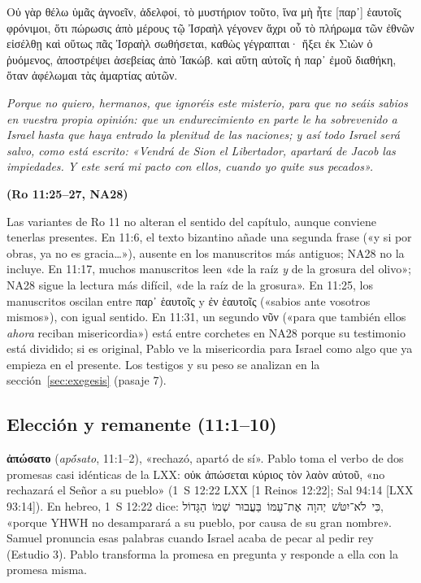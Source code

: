 \documentclass[11pt,letterpaper]{article}
\newcommand{\heb}[1]{\mbox{\foreignlanguage{hebrew}{#1}}}
\newcommand{\grc}[1]{\foreignlanguage{ancientgreek}{#1}}
\newcommand{\fuente}[1]{\par\hfill{\upshape\bfseries\small\textcolor{ladrillo}{#1}}}
\begin{document}
\begin{cita}[fontupper=\upshape]
\grc{Οὐ γὰρ θέλω ὑμᾶς ἀγνοεῖν, ἀδελφοί, τὸ μυστήριον τοῦτο, ἵνα μὴ ἦτε [παρ᾿] ἑαυτοῖς φρόνιμοι, ὅτι πώρωσις ἀπὸ μέρους τῷ Ἰσραὴλ γέγονεν ἄχρι οὗ τὸ πλήρωμα τῶν ἐθνῶν εἰσέλθῃ καὶ οὕτως πᾶς Ἰσραὴλ σωθήσεται, καθὼς γέγραπται· ἥξει ἐκ Σιὼν ὁ ῥυόμενος, ἀποστρέψει ἀσεβείας ἀπὸ Ἰακώβ. καὶ αὕτη αὐτοῖς ἡ παρ᾿ ἐμοῦ διαθήκη, ὅταν ἀφέλωμαι τὰς ἁμαρτίας αὐτῶν.}\par\smallskip
\itshape Porque no quiero, hermanos, que ignoréis este misterio, para que no seáis sabios en vuestra propia opinión: que un endurecimiento en parte le ha sobrevenido a Israel hasta que haya entrado la plenitud de las naciones; y así todo Israel será salvo, como está escrito: «Vendrá de Sion el Libertador, apartará de Jacob las impiedades. Y este será mi pacto con ellos, cuando yo quite sus pecados».\fuente{(Ro 11:25--27, NA28)}
\end{cita}

\begin{nota}
Las variantes de Ro 11 no alteran el sentido del capítulo, aunque conviene tenerlas presentes. En 11:6, el texto bizantino añade una segunda frase («y si por obras, ya no es gracia\ldots»), ausente en los manuscritos más antiguos; NA28 no la incluye. En 11:17, muchos manuscritos leen «de la raíz \emph{y} de la grosura del olivo»; NA28 sigue la lectura más difícil, «de la raíz de la grosura». En 11:25, los manuscritos oscilan entre \grc{παρ᾿ ἑαυτοῖς} y \grc{ἐν ἑαυτοῖς} («sabios ante vosotros mismos»), con igual sentido. En 11:31, un segundo \grc{νῦν} («para que también ellos \emph{ahora} reciban misericordia») está entre corchetes en NA28 porque su testimonio está dividido; si es original, Pablo ve la misericordia para Israel como algo que ya empieza en el presente. Los testigos y su peso se analizan en la sección~\ref{sec:exegesis} (pasaje 7).
\end{nota}

\subsection{Elección y remanente (11:1--10)}

\textbf{\grc{ἀπώσατο}} (\emph{apṓsato}, 11:1--2), «rechazó, apartó de sí». Pablo toma el verbo de dos promesas casi idénticas de la LXX: \grc{οὐκ ἀπώσεται κύριος τὸν λαὸν αὐτοῦ}, «no rechazará el Señor a su pueblo» (1~S 12:22 LXX [1 Reinos 12:22]; Sal 94:14 [LXX 93:14]). En hebreo, 1~S 12:22 dice: \heb{כִּי לֹא־יִטֹּשׁ יְהוָה אֶת־עַמּוֹ בַּעֲבוּר שְׁמוֹ הַגָּדוֹל}, «porque YHWH no desamparará a su pueblo, por causa de su gran nombre». Samuel pronuncia esas palabras cuando Israel acaba de pecar al pedir rey (Estudio 3). Pablo transforma la promesa en pregunta y responde a ella con la promesa misma.
\end{document}
